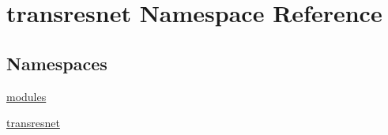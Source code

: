 \hypertarget{namespacetransresnet}{}\section{transresnet Namespace Reference}
\label{namespacetransresnet}
\subsection*{Namespaces}
\begin{DoxyCompactItemize}
\item 
 \hyperlink{namespacetransresnet_1_1modules}{modules}
\item 
 \hyperlink{namespacetransresnet_1_1transresnet}{transresnet}
\end{DoxyCompactItemize}
